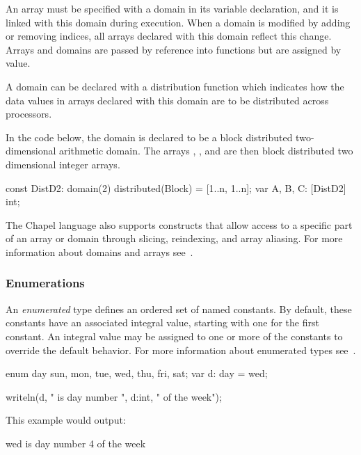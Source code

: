 An array must be specified with a domain in its variable declaration,
and it is linked with this domain during execution.  When a domain is
modified by adding or removing indices, all arrays declared with this
domain reflect this change.  Arrays and domains are passed by
reference into functions but are assigned by value.

A domain can be declared with a distribution function which indicates
how the data values in arrays declared with this domain are to be
distributed across processors.

\begin{example}
In the code below, the domain  is declared to be a 
block distributed two-dimensional arithmetic domain.
The arrays , , and  are then block distributed
two dimensional integer arrays.
\begin{chapel}
const DistD2: domain(2) distributed(Block) = [1..n, 1..n];
var A, B, C: [DistD2] int;
\end{chapel}
\end{example}

The Chapel language also supports constructs that allow 
access to a specific part of an array or domain through slicing,
reindexing, and array aliasing.   For more information about 
domains and arrays see~.
 
\subsubsection{Enumerations}
An \emph{enumerated} type defines an ordered set of named constants.
By default, these constants have an associated 
integral value, starting with one for the first constant. 
An integral value may be assigned to one or more of the constants
to override the default behavior.  For more information about
enumerated types see~.

\begin{example}
\begin{chapel}
enum day {sun, mon, tue, wed, thu, fri, sat};
var d: day = wed;

writeln(d, " is day number ", d:int, " of the week");
\end{chapel}

This example would output:
\begin{commandline}
wed is day number 4 of the week
\end{commandline}
\end{example}

